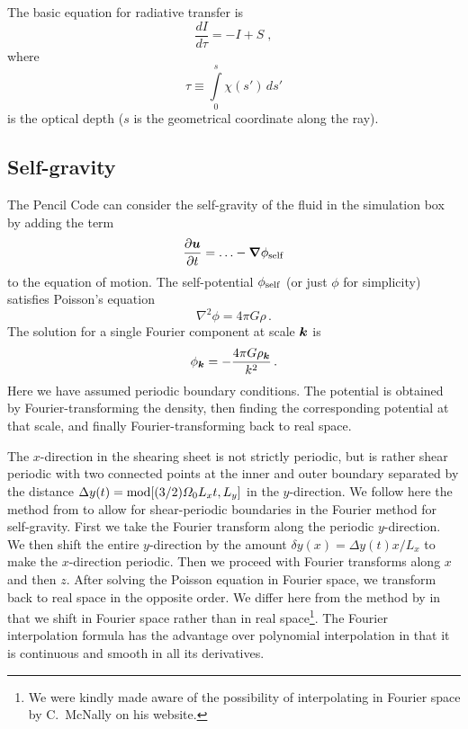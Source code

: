 \documentclass[\mydriver,12pt,twoside,notitlepage,a4paper]{article}
\renewcommand{\vec}[1]{\mbox{\boldmath{$#1$}}}
\newcommand{\vcs}[1]  {\mbox{\boldmath{$\scriptstyle{#1}$}}}
\newcommand{\nab}{\mbox{\boldmath $\nabla$} {}}
\begin{document}
The basic equation for radiative transfer is
\begin{equation} \label{radiative-transfer}
  \frac{dI}{d\tau} = -I +S \; ,
\end{equation}
where
\begin{equation}
  \tau \equiv \int\limits_0^s \chi(s') \, ds'
\end{equation}
is the optical depth ($s$ is the geometrical coordinate along the ray).


\subsection{Self-gravity}

The {\sc Pencil Code} can consider the self-gravity of the fluid in the simulation
box by adding the term
\begin{equation}
  \frac{\partial \vec{u}}{\partial t}
      = \ldots - \nab \phi_{\rm self}
\end{equation}
to the equation of motion. The self-potential $\phi_{\rm self}$ (or just
$\phi$ for simplicity) satisfies Poisson's equation
\begin{equation}
  \nabla^2 \phi = 4 \pi G \rho \, .
\end{equation}
The solution for a single Fourier component at scale $\vec{k}$ is
\begin{equation}
  \phi_{\vcs{k}} = -\frac{4 \pi G \rho_{\vcs{k}}}{k^2} \, .
\end{equation}
Here we have assumed periodic boundary conditions. The potential is obtained by
Fourier-transforming the density, then finding the corresponding potential at
that scale, and finally Fourier-transforming back to real space.

The $x$-direction in the shearing sheet is not strictly periodic, but is rather
shear periodic with two connected points at the inner and outer boundary
separated by the distance $\Delta y(t)={\rm mod}[(3/2) \varOmega_0 L_x t,L_y]$
in the $y$-direction. We follow here the method from \cite{Gammie2001} to allow
for shear-periodic boundaries in the Fourier method for self-gravity. First we
take the Fourier transform along the periodic $y$-direction. We then shift
the entire $y$-direction by the amount $\delta y(x)=\Delta y(t) x/L_x$ to make
the $x$-direction periodic. Then we proceed with Fourier transforms along $x$
and then $z$. After solving the Poisson equation in Fourier space, we transform
back to real space in the opposite order. We differ here from the method by
\cite{Gammie2001} in that we shift in Fourier space rather than in real
space\footnote{We were kindly made aware of the possibility of interpolating in
Fourier space by C.\ McNally on his website.}. The Fourier interpolation formula
has the advantage over polynomial interpolation in that it is continuous and
smooth in all its derivatives.
\end{document}
